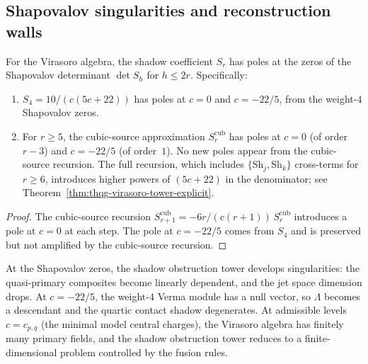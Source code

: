 
\subsection{Shapovalov singularities and reconstruction walls}
\label{subsec:shapovalov-singularities}

\begin{proposition}
\label{prop:shapovalov-shadow-singularities}
For the Virasoro algebra, the shadow coefficient $S_r$
has poles at the zeros of the Shapovalov determinant
$\det S_h$ for $h \leq 2r$. Specifically:
\begin{enumerate}[label=\textup{(\roman*)}]
\item $S_4 = 10/(c(5c+22))$ has poles at $c = 0$ and
 $c = -22/5$, from the weight-$4$ Shapovalov zeros.
\item For $r \geq 5$, the cubic-source approximation
 $S_r^{\mathrm{cub}}$ has poles at $c = 0$
 (of order $r - 3$) and $c = -22/5$ (of order~$1$).
 No new poles appear from the cubic-source recursion.
 The full recursion, which includes
 $\{\mathrm{Sh}_j, \mathrm{Sh}_k\}$ cross-terms
 for $r \geq 6$, introduces higher powers of
 $(5c+22)$ in the denominator; see
 Theorem~\textup{\ref{thm:thqg-virasoro-tower-explicit}}.
\end{enumerate}
\end{proposition}

\begin{proof}
The cubic-source recursion
$S_{r+1}^{\mathrm{cub}} = -6r/(c(r+1))\,S_r^{\mathrm{cub}}$
introduces a pole at $c = 0$ at each step. The pole at
$c = -22/5$ comes from $S_4$ and is preserved but not
amplified by the cubic-source recursion.
\end{proof}

\begin{remark}
\label{rem:singular-vectors-walls}
At the Shapovalov zeros, the shadow obstruction tower develops
singularities: the quasi-primary composites become
linearly dependent, and the jet space dimension drops.
At $c = -22/5$, the weight-$4$ Verma module has a null
vector, so $\Lambda$ becomes a descendant and the quartic
contact shadow degenerates. At admissible levels
$c = c_{p,q}$ (the minimal model central charges), the
Virasoro algebra has finitely many primary fields, and
the shadow obstruction tower reduces to a finite-dimensional problem
controlled by the fusion rules.
\end{remark}

